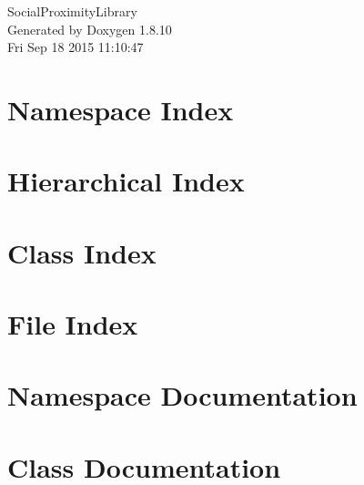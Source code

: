 \documentclass[twoside]{book}
\newcommand{\+}{\discretionary{\mbox{\scriptsize$\hookleftarrow$}}{}{}}
\newcommand{\clearemptydoublepage}{%
  \newpage{\pagestyle{empty}\cleardoublepage}%
}
\begin{document}
\hypersetup{pageanchor=false,
             bookmarks=true,
             bookmarksnumbered=true,
             pdfencoding=unicode
            }
\begin{titlepage}
\vspace*{7cm}
\begin{center}%
{\Large Social\+Proximity\+Library }\\
\vspace*{1cm}
{\large Generated by Doxygen 1.8.10}\\
\vspace*{0.5cm}
{\small Fri Sep 18 2015 11:10:47}\\
\end{center}
\end{titlepage}
\clearemptydoublepage
\tableofcontents
\clearemptydoublepage
{}
\hypersetup{pageanchor=true}

\chapter{Namespace Index}

\chapter{Hierarchical Index}

\chapter{Class Index}

\chapter{File Index}

\chapter{Namespace Documentation}



\chapter{Class Documentation}














\end{document}
